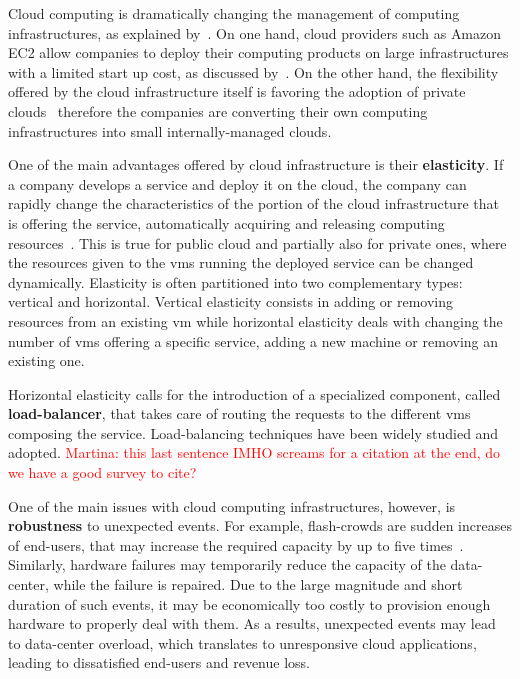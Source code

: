 Cloud computing is dramatically changing the management of computing
infrastructures, as explained by~\cite{WPonMckinsey13}. On one hand,
cloud providers such as Amazon EC2 allow companies to deploy their
computing products on large infrastructures with a limited start up
cost, as discussed by~\cite{Buyya09:FGCS}. On the other hand, the
flexibility offered by the cloud infrastructure itself is favoring the
adoption of private clouds~\cite{Gulati11:HotCloud} therefore the companies are converting their own computing infrastructures into small internally-managed clouds.

One of the main advantages offered by cloud infrastructure is their
{\bf elasticity}. If a company develops a service and deploy it on the
cloud, the company can rapidly change the characteristics of the
portion of the cloud infrastructure that is offering the service,
automatically acquiring and releasing computing
resources~\cite{Herbst13:ICAC}. This is true for public cloud and
partially also for private ones, where the resources given to the
\acp{vm} running the deployed service can be changed dynamically.
Elasticity is often partitioned into two complementary types: vertical
and horizontal. Vertical elasticity consists in adding or removing
resources from an existing \ac{vm} while horizontal elasticity deals
with changing the number of \acp{vm} offering a specific service,
adding a new machine or removing an existing one.

Horizontal elasticity calls for the introduction of a specialized
component, called {\bf load-balancer}, that takes care of routing the
requests to the different \acp{vm} composing the
service. Load-balancing techniques have been widely studied and
adopted. \textcolor{red}{Martina: this last sentence IMHO screams for
  a citation at the end, do we have a good survey to cite?}

One of the main issues with cloud computing infrastructures, however,
is {\bf robustness} to unexpected events. For example, flash-crowds
are sudden increases of end-users, that may increase the required
capacity by up to five times~\cite{Bodik10:SoCC}. Similarly, hardware
failures may temporarily reduce the capacity of the data-center, while
the failure is repaired. Due to the large magnitude and short duration
of such events, it may be economically too costly to provision enough
hardware to properly deal with them. As a results, unexpected events
may lead to data-center overload, which translates to unresponsive
cloud applications, leading to dissatisfied end-users and revenue
loss.

